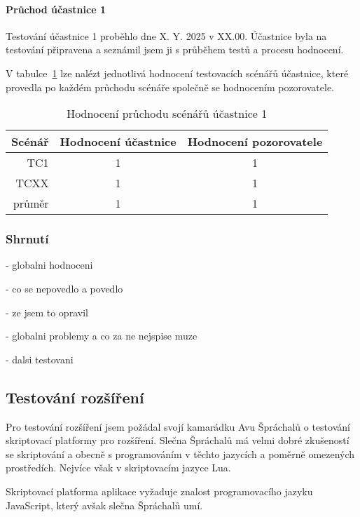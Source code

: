 \paragraph{Průchod účastnice 1}

Testování účastnice 1 proběhlo dne X. Y. 2025 v XX.00. 
Účastnice byla na testování připravena a seznámil jsem ji s průběhem testů a procesu hodnocení. 

V tabulce~\ref{tab:hodnoceniPruchoduUcastnika1} lze nalézt jednotlivá hodnocení testovacích scénářů účastnice, které provedla po každém průchodu scénáře společně se hodnocením pozorovatele.

\begin{table}[ht!]
\centering
    \caption{Hodnocení průchodu scénářů účastnice 1}\label{tab:hodnoceniPruchoduUcastnika1}
    \begin{tabular}{r|c|c}
        Scénář & Hodnocení účastnice & Hodnocení pozorovatele\\\hline\hline
        TC1  & 1 & 1\\\hline
        TCXX & 1 & 1\\\hline\hline
        průměr & 1 & 1\\
    \end{tabular}
\end{table}

\subsubsection{Shrnutí}

- globalni hodnoceni

- co se nepovedlo a povedlo

- ze jsem to opravil

- globalni problemy a co za ne nejspise muze

- dalsi testovani

\subsection{Testování rozšíření}

Pro testování rozšíření jsem požádal svojí kamarádku Avu Špráchalů o testování skriptovací platformy pro rozšíření.
Slečna Špráchalů má velmi dobré zkušeností se skriptování a obecně s programováním v těchto jazycích a poměrně omezených prostředích.
Nejvíce však v skriptovacím jazyce Lua.

Skriptovací platforma aplikace vyžaduje znalost programovacího jazyku JavaScript, který avšak slečna Špráchalů umí.

